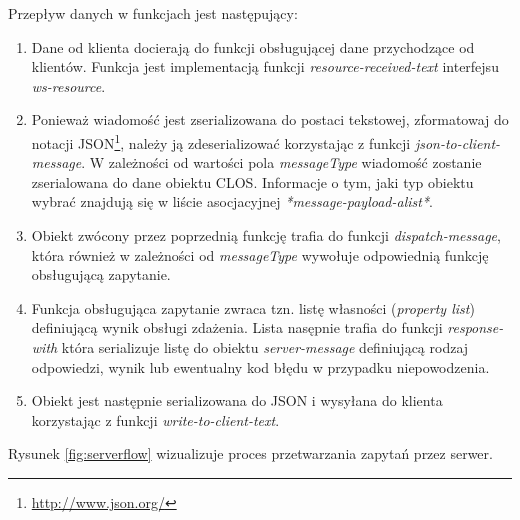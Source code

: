 Przepływ danych w funkcjach jest następujący:
\begin{enumerate}
\item Dane od klienta docierają do funkcji obsługującej dane przychodzące od klientów. Funkcja jest implementacją funkcji \emph{resource-received-text} interfejsu \emph{ws-resource}.
\item Ponieważ wiadomość jest zserializowana do postaci tekstowej, zformatowaj do notacji JSON\footnote{\url{http://www.json.org/}}, należy ją zdeserializować korzystając z funkcji \emph{json-to-client-message}. W zależności od wartości pola \emph{messageType} wiadomość zostanie zserialowana do dane obiektu CLOS. Informacje o tym, jaki typ obiektu wybrać znajdują się w liście asocjacyjnej \emph{*message-payload-alist*}.
\item Obiekt zwócony przez poprzednią funkcję trafia do funkcji \emph{dispatch-message}, która również w zależności od \emph{messageType} wywołuje odpowiednią funkcję obsługującą zapytanie.
\item Funkcja obsługująca zapytanie zwraca tzn. listę własności (\emph{property list}) definiującą wynik obsługi zdażenia. Lista nasępnie trafia do funkcji \emph{response-with} która serializuje listę do obiektu \emph{server-message} definiującą rodzaj odpowiedzi, wynik lub ewentualny kod błędu w przypadku niepowodzenia.
\item Obiekt jest następnie serializowana do JSON i wysyłana do klienta korzystając z funkcji \emph{write-to-client-text}.
\end{enumerate}
Rysunek \ref{fig:serverflow} wizualizuje proces przetwarzania zapytań przez serwer.

